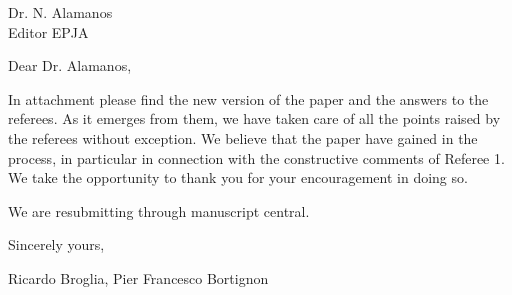 \documentclass[a4paper,12pt]{book}
\begin{document}
\begin{flushleft}
 Dr. N. Alamanos\\


Editor EPJA
\end{flushleft}
Dear Dr. Alamanos,

In attachment please find the new version of the paper and the answers to the referees. As it emerges from them, we have taken care of all the points raised by the referees without exception. We believe that the paper have gained in the process, in particular in connection with the constructive comments of Referee 1. We take the opportunity to thank you for your encouragement in doing so. 

We are resubmitting through manuscript central.

Sincerely yours,
\begin{flushright}
Ricardo Broglia, Pier Francesco Bortignon
	\end{flushright}
\end{document}
